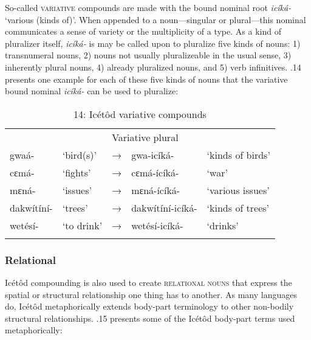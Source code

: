 So-called \textsc{variative} compounds are made with the bound nominal root \textit{icíká-} ‘various (kinds of)’. When appended to a noun—singular or plural—this nominal communicates a sense of variety or the multiplicity of a type. As a kind of pluralizer itself, \textit{icíká-} is may be called upon to pluralize five kinds of nouns: 1) transnumeral nouns, 2) nouns not usually pluralizeable in the usual sense, 3) inherently plural nouns, 4) already pluralized nouns, and 5) verb infinitives. .14 presents one example for each of these five kinds of nouns that the variative bound nominal \textit{icíká-} can be used to pluralize:


\begin{table}
\caption{14: Icétôd variative compounds}
\label{tab:4}


\begin{tabularx}{\textwidth}{XXXXX}
\lsptoprule

\multicolumn{2}{X}{Singular/Plural} &  & \multicolumn{2}{X}{Variative plural}\\
gwaá- & ‘bird(s)’ & → & gwa-icíká- & ‘kinds of birds’\\
cɛmá- & ‘fights’ & → & cɛmá-ícíká- & ‘war’\\
mɛná- & ‘issues’ & → & mɛná-ícíká- & ‘various issues’\\
dakwítíní- & ‘trees’ & → & dakwítíní-icíká- & ‘kinds of trees’\\
wetésí- & ‘to drink’ & → & wetésí-icíká- & ‘drinks’\\
\lspbottomrule
\end{tabularx}
\end{table}

\subsubsection{Relational} 

Icétôd compounding is also used to create \textsc{relational nouns} that express the spatial or structural relationship one thing has to another. As many languages do, Icétôd metaphorically extends body-part terminology to other non-bodily structural relationships. .15 presents some of the Icétôd body-part terms used metaphorically:


